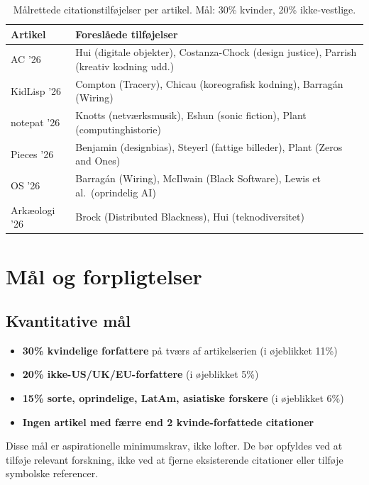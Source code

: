 \documentclass[10pt,letterpaper,twocolumn]{article}
\begin{document}
\begin{table}[h]
\small\centering
\begin{tabularx}{\columnwidth}{lX}
\toprule
\textbf{Artikel} & \textbf{Foreslåede tilføjelser} \\
\midrule
AC '26 & Hui (digitale objekter), Costanza-Chock (design justice), Parrish (kreativ kodning udd.) \\
\addlinespace
KidLisp '26 & Compton (Tracery), Chicau (koreografisk kodning), Barrag\'an (Wiring) \\
\addlinespace
notepat '26 & Knotts (netværksmusik), Eshun (sonic fiction), Plant (computinghistorie) \\
\addlinespace
Pieces '26 & Benjamin (designbias), Steyerl (fattige billeder), Plant (Zeros and Ones) \\
\addlinespace
OS '26 & Barrag\'an (Wiring), McIlwain (Black Software), Lewis et al.\ (oprindelig AI) \\
\addlinespace
Arkæologi '26 & Brock (Distributed Blackness), Hui (teknodiversitet) \\
\bottomrule
\end{tabularx}
\caption{Målrettede citationstilføjelser per artikel. Mål: 30\% kvinder, 20\% ikke-vestlige.}
\label{tab:targets}
\end{table}

\section{Mål og forpligtelser}

\subsection{Kvantitative mål}

\begin{itemize}
  \item \textbf{30\% kvindelige forfattere} på tværs af artikelserien (i øjeblikket 11\%)
  \item \textbf{20\% ikke-US/UK/EU-forfattere} (i øjeblikket 5\%)
  \item \textbf{15\% sorte, oprindelige, LatAm, asiatiske forskere} (i øjeblikket 6\%)
  \item \textbf{Ingen artikel med færre end 2 kvinde-forfattede citationer}
\end{itemize}

Disse mål er aspirationelle minimumskrav, ikke lofter. De bør opfyldes ved at tilføje relevant forskning, ikke ved at fjerne eksisterende citationer eller tilføje symbolske referencer.
\end{document}
